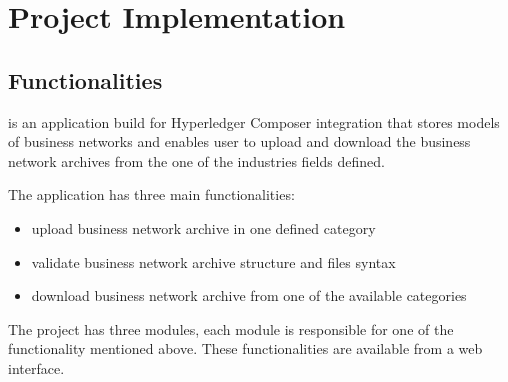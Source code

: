 \chapter{Project Implementation}
\label{chapter:chapter3}

\section{Functionalities}
\label{sub-sec:chapter3-section1}
\textbf{\project} is an application build for Hyperledger Composer integration that stores models of business networks and enables user to upload and download the business network archives from the one of the industries fields defined.

The application has three main functionalities:
\begin{itemize}
	\item upload business network archive in one defined category
	\item validate business network archive structure and files syntax
	\item download business network archive from one of the available categories
\end{itemize}
The project has three modules, each module is responsible for one of the functionality mentioned above.
These functionalities are available from a web interface.

